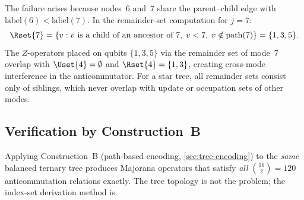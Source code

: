 The failure arises because nodes~6 and~7 share the parent--child
edge with $\text{label}(6) < \text{label}(7)$.  In the remainder-set
computation for $j = 7$:
\[
  \Rset{7} = \{v : v \text{ is a child of an ancestor of } 7,\;
    v < 7,\; v \notin \text{path}(7)\} = \{1, 3, 5\}.
\]
The $Z$-operators placed on qubits $\{1, 3, 5\}$ via the remainder
set of mode~7 overlap with $\Uset{4} = \emptyset$ and $\Rset{4} =
\{1, 3\}$, creating cross-mode interference in the anticommutator.
For a star tree, all remainder sets consist only of siblings, which
never overlap with update or occupation sets of other modes.

\subsection*{Verification by Construction~B}

Applying Construction~B (path-based encoding,
\cref{sec:tree-encoding}) to the \emph{same} balanced ternary tree
produces Majorana operators that satisfy \emph{all} $\binom{16}{2} =
120$ anticommutation relations exactly.  The tree topology is not the
problem; the index-set derivation method is.
